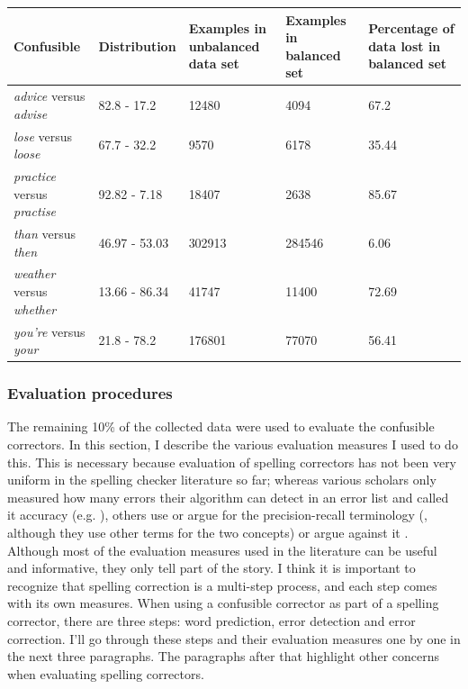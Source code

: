 \documentclass[12pt]{article}
\begin{document}

\begin{table}[h] \footnotesize
\begin{tabular}{|l|l|p{3cm}|l|p{3cm}|}
\hline
Confusible&Distribution&Examples in unbalanced data set&Examples in balanced set&Percentage of data lost in balanced set\\
\hline
\emph{advice} versus \emph{advise}&82.8 - 17.2&12480&4094&67.2\\
\emph{lose} versus \emph{loose}&67.7 - 32.2&9570&6178&35.44\\
\emph{practice} versus \emph{practise}&92.82 - 7.18&18407&2638&85.67\\
\emph{than} versus \emph{then}&46.97 - 53.03&302913&284546&6.06\\
\emph{weather} versus \emph{whether}&13.66 - 86.34&41747&11400&72.69\\
\emph{you're} versus \emph{your}&21.8 - 78.2&176801&77070&56.41\\
\hline
\end{tabular}
\end{table}

\subsubsection{Evaluation procedures} \label{eval}

The remaining 10\% of the collected data were used to evaluate the confusible correctors. In this section, I describe the various evaluation measures I used to do this. This is necessary because evaluation of spelling correctors has not been very uniform in the spelling checker literature so far; whereas various scholars only measured how many errors their algorithm can detect in an error list and called it accuracy (e.g. \citealp{agirre98, bm00, tm02,vandelden04}), others use or argue for the precision-recall terminology (\citealp{reynaert08,pz84}, although they use other terms for the two concepts) or argue against it \citep{sp02}.\\\indent
Although most of the evaluation measures used in the literature can be useful and informative, they only tell part of the story. I think it is important to recognize that spelling correction is a multi-step process, and each step comes with its own measures. When using a confusible corrector as part of a spelling corrector, there are three steps: word prediction, error detection and error correction. I'll go through these steps and their evaluation measures one by one in the next three paragraphs. The paragraphs after that highlight other concerns when evaluating spelling correctors.
\end{document}
